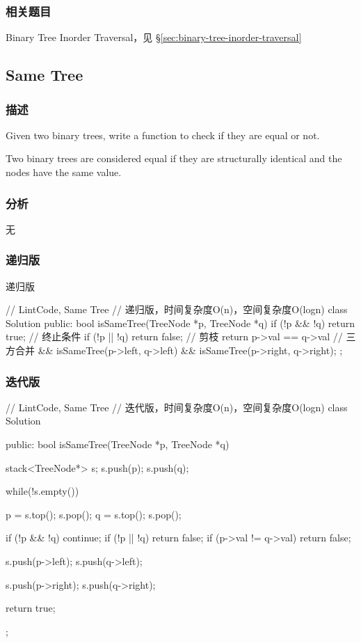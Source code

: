 \subsubsection{相关题目}
\begindot
\item Binary Tree Inorder Traversal，见 \S \ref{sec:binary-tree-inorder-traversal}
\myenddot


\subsection{Same Tree}
\label{sec:same-tree}


\subsubsection{描述}
Given two binary trees, write a function to check if they are equal or not.

Two binary trees are considered equal if they are structurally identical and the nodes have the same value.


\subsubsection{分析}
无


\subsubsection{递归版}
递归版
\begin{Code}
// LintCode, Same Tree
// 递归版，时间复杂度O(n)，空间复杂度O(logn)
class Solution {
public:
    bool isSameTree(TreeNode *p, TreeNode *q) {
        if (!p && !q) return true;   // 终止条件
        if (!p || !q) return false;  // 剪枝
        return p->val == q->val      // 三方合并
                && isSameTree(p->left, q->left)
                && isSameTree(p->right, q->right);
    }
};
\end{Code}


\subsubsection{迭代版}
\begin{Code}
// LintCode, Same Tree
// 迭代版，时间复杂度O(n)，空间复杂度O(logn)
class Solution {
public:
    bool isSameTree(TreeNode *p, TreeNode *q) {
        stack<TreeNode*> s;
        s.push(p);
        s.push(q);

        while(!s.empty()) {
            p = s.top(); s.pop();
            q = s.top(); s.pop();

            if (!p && !q) continue;
            if (!p || !q) return false;
            if (p->val != q->val) return false;

            s.push(p->left);
            s.push(q->left);

            s.push(p->right);
            s.push(q->right);
        }
        return true;
    }
};
\end{Code}


